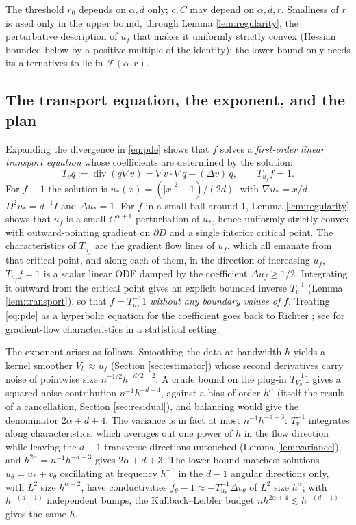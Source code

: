 \documentclass[12pt]{article}
\numberwithin{equation}{section}
\newcommand{\diver}{\operatorname{div}}
\begin{document}
The threshold $r_0$ depends on $\alpha,d$ only; $c,C$ may depend on
$\alpha,d,r$. Smallness of $r$ is used only in the
upper bound, through Lemma \ref{lem:regularity}, the perturbative
description of $u_f$ that makes it uniformly strictly convex (Hessian
bounded below by a positive multiple of the identity); the lower bound
only needs its alternatives to lie in $\mathcal F(\alpha,r)$.

\subsection{The transport equation, the exponent, and the plan}\label{sec:heuristic}

Expanding the divergence in \eqref{eq:pde} shows that $f$ solves a
\emph{first-order linear transport equation} whose coefficients are
determined by the solution:
\begin{equation}\label{eq:transportdef}
 T_vq:=\diver(q\nabla v)=\nabla v\cdot\nabla q+(\Delta v)\,q,
 \qquad T_{u_f}f=1 .
\end{equation}
For $f\equiv1$ the solution is $u_*(x)=(|x|^2-1)/(2d)$, with
$\nabla u_*=x/d$, $D^2u_*=d^{-1}I$ and $\Delta u_*=1$. For $f$ in a
small ball around $1$, Lemma \ref{lem:regularity} shows that $u_f$ is
a small $C^{\alpha+1}$ perturbation of $u_*$, hence uniformly strictly
convex with outward-pointing gradient on $\partial D$ and a single
interior critical point. The characteristics of $T_{u_f}$ are the
gradient flow lines of $u_f$, which all emanate from that critical
point, and along each of them, in the direction of increasing $u_f$,
$T_{u_f}f=1$ is a scalar linear ODE damped by the coefficient
$\Delta u_f\ge1/2$. Integrating it outward from the critical point
gives an explicit bounded inverse $T_v^{-1}$ (Lemma
\ref{lem:transport}), so that $f=T_{u_f}^{-1}1$ \emph{without any
boundary values of $f$}. Treating \eqref{eq:pde} as a hyperbolic
equation for the coefficient goes back to Richter \cite{Richter}; see
\cite{KSV} for gradient-flow characteristics in a statistical setting.

The exponent arises as follows. Smoothing the data at bandwidth $h$
yields a kernel smoother $V_h\approx u_f$ (Section
\ref{sec:estimator}) whose second derivatives carry noise of
pointwise size $n^{-1/2}h^{-d/2-2}$. A crude bound on the
plug-in $T_{V_h}^{-1}1$ gives a squared noise contribution
$n^{-1}h^{-d-4}$, against a bias of order $h^\alpha$ (itself the result
of a cancellation, Section \ref{sec:residual}), and balancing would
give the denominator $2\alpha+d+4$. The variance is in fact at most
$n^{-1}h^{-d-3}$: $T_v^{-1}$ integrates along characteristics, which
averages out one power of $h$ in the flow direction while leaving the
$d-1$ transverse directions untouched (Lemma \ref{lem:variance}), and
$h^{2\alpha}=n^{-1}h^{-d-3}$ gives $2\alpha+d+3$. The lower bound
matches: solutions $u_\theta=u_*+v_\theta$ oscillating at frequency
$h^{-1}$ in the $d-1$ angular directions only, with $L^2$ size
$h^{\alpha+2}$, have conductivities
$f_\theta-1\approx-T_{u_*}^{-1}\Delta v_\theta$ of $L^2$ size
$h^\alpha$; with $h^{-(d-1)}$ independent bumps, the Kullback--Leibler
budget $nh^{2\alpha+4}\lesssim h^{-(d-1)}$ gives the same $h$.
\end{document}

